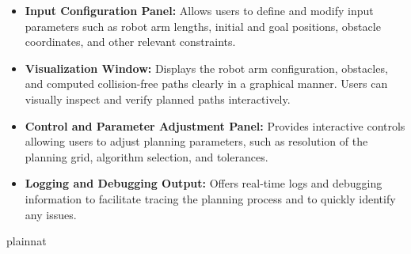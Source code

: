 \documentclass[12pt, titlepage]{article}
\begin{document}
\begin{itemize}
    \item \textbf{Input Configuration Panel:}  
    Allows users to define and modify input parameters such as robot arm lengths, initial and goal positions, obstacle coordinates, and other relevant constraints.

    \item \textbf{Visualization Window:}  
      Displays the robot arm configuration, obstacles, and computed collision-free paths clearly in a graphical manner. Users can visually inspect and verify planned paths interactively.

    \item \textbf{Control and Parameter Adjustment Panel:}  
      Provides interactive controls allowing users to adjust planning parameters, such as resolution of the planning grid, algorithm selection, and tolerances.

    \item \textbf{Logging and Debugging Output:}  
      Offers real-time logs and debugging information to facilitate tracing the planning process and to quickly identify any issues.

    \end{itemize}







 {plainnat}


\newpage{}
\end{document}
